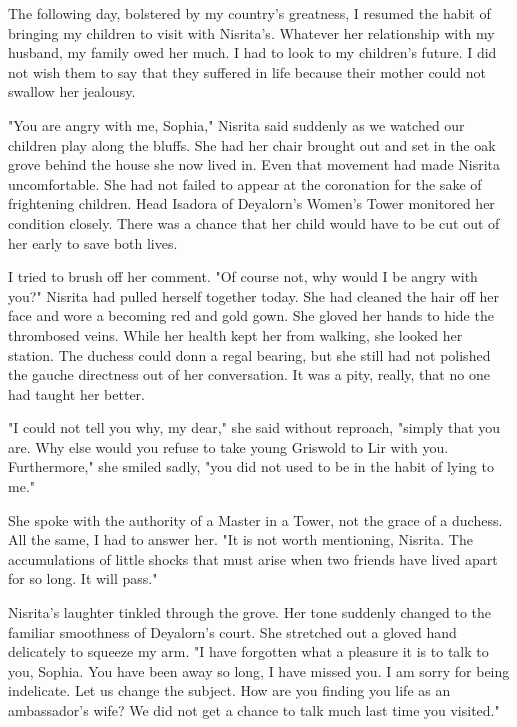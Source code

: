 \documentclass{article}
\begin{document}
\vspace{.5cm}

The following day, bolstered by my country's greatness, I resumed the habit of bringing my children to visit with Nisrita's. Whatever her relationship with my husband, my family owed her much. I had to look to my children's future. I did not wish them to say that they suffered in life because their mother could not swallow her jealousy. 

"You are angry with me, Sophia," Nisrita said suddenly as we watched our children play along the bluffs. She had her chair brought out and set in the oak grove behind the house she now lived in. Even that movement had made Nisrita uncomfortable. She had not failed to appear at the coronation for the sake of frightening children. Head Isadora of Deyalorn's Women's Tower monitored her condition closely. There was a chance that her child would have to be cut out of her early to save both lives. 

I tried to brush off her comment. "Of course not, why would I be angry with you?" Nisrita had pulled herself together today. She had cleaned the hair off her face and wore a becoming red and gold gown. She gloved her hands to hide the thrombosed veins. While her health kept her from walking, she looked her station. The duchess could donn a regal bearing, but she still had not polished the gauche directness out of her conversation. It was a pity, really, that no one had taught her better.

"I could not tell you why, my dear," she said without reproach, "simply that you are. Why else would you refuse to take young Griswold to Lir with you. Furthermore," she smiled sadly, "you did not used to be in the habit of lying to me."

She spoke with the authority of  a Master in a Tower, not the grace of a duchess. All the same, I had to answer her. "It is not worth mentioning, Nisrita. The accumulations of little shocks that must arise when two friends have lived apart for so long. It will pass."

Nisrita's laughter tinkled through the grove. Her tone suddenly changed to the familiar smoothness of Deyalorn's court. She stretched out a gloved hand delicately to squeeze my arm. "I have forgotten what a pleasure it is to talk to you, Sophia. You have been away so long, I have missed you. I am sorry for being indelicate. Let us change the subject. How are you finding you life as an ambassador's wife? We did not get a chance to talk much last time you visited."
\end{document}
